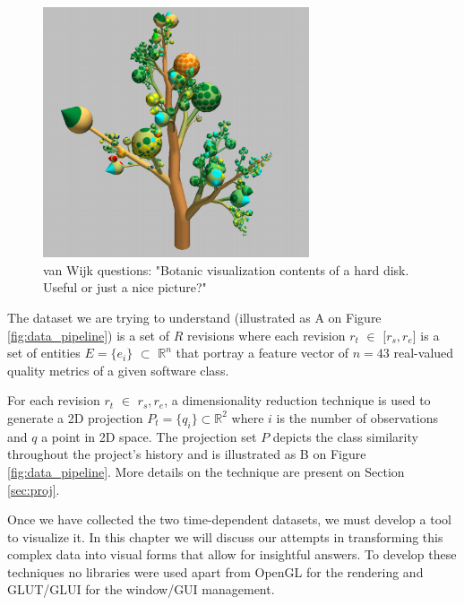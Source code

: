 \begin{figure}[h]
	\centering
	\includegraphics[width=0.7\textwidth]{figures/botanic.png}
	\caption {van Wijk questions: "Botanic visualization contents of a hard disk. Useful or just a nice picture?"}
	\label{fig:botanic}
\end{figure}

The dataset we are trying to understand (illustrated as A on Figure \ref{fig:data_pipeline}) is a set of $R$ revisions where each revision $r_{t}$ $\in$ [$r_{s}, r_{e}$] \hspace{0.2cm}is a set of entities $E = \{ e_{i}\}$ $\subset$ $\mathbb{R}^{n}$ that portray a feature vector of $n = 43$ real-valued quality metrics of a given software class.

For each revision $r_{t}$ $\in$ \lbrack  $r_{s}, r_{e}$\rbrack, a dimensionality reduction technique is used to generate a 2D projection $P_{t} = \{q_{i} \} \subset{\mathbb{R}^{2}}$ where $i$ is the number of observations and $q$ a point in 2D space. The projection set $P$ depicts the class similarity throughout the project's history and is illustrated as B on Figure \ref{fig:data_pipeline}. More details on the technique are present on Section \ref{sec:proj}.

Once we have collected the two time-dependent datasets, we must develop a tool to visualize it. In this chapter we will discuss our attempts in transforming this complex data into visual forms that allow for insightful answers. To develop these techniques no libraries were used apart from OpenGL for the rendering and GLUT/GLUI for the window/GUI management.
